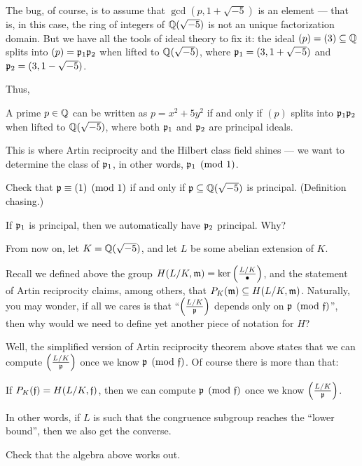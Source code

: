 The bug, of course, is to assume that $\gcd(p, 1 + \sqrt{-5})$ is an element --- that is,
in this case, the ring of integers of $\mathbb Q(\sqrt{-5})$ is not an unique factorization domain.
But we have all the tools of ideal theory to fix it:
the ideal $(p) = (3) \subseteq \mathbb Q$ splits into $(p) = \mathfrak p_1 \mathfrak p_2$ when lifted to $\mathbb Q(\sqrt{-5})$,
where $\mathfrak p_1 = (3, 1 + \sqrt{-5})$ and $\mathfrak p_2 = (3, 1 - \sqrt{-5})$.

Thus,
\begin{proposition}
	A prime $p \in \mathbb Q$ can be written as $p = x^2 + 5 y^2$ if and only if $(p)$ splits into $\mathfrak p_1
	\mathfrak p_2$ when lifted to $\mathbb Q(\sqrt{-5})$, where both $\mathfrak p_1$ and $\mathfrak p_2$ are principal ideals.
\end{proposition}

This is where Artin reciprocity and the Hilbert class field shines --- we want to determine the
class of $\mathfrak p_1$, in other words, $\mathfrak p_1 \pmod{1}$.
\begin{ques}
	Check that $\mathfrak p \equiv (1) \pmod{1}$ if and only if $\mathfrak p \subseteq \mathbb Q(\sqrt{-5})$ is principal.
	(Definition chasing.)
\end{ques}
\begin{ques}
	If $\mathfrak p_1$ is principal, then we automatically have $\mathfrak p_2$ principal. Why?
\end{ques}

From now on, let $K = \mathbb Q(\sqrt{-5})$, and let $L$ be some abelian extension of $K$.

Recall we defined above the group $H(L/K, \mathfrak m) = \ker \left(\frac{L/K}{\bullet}\right)$, and the
statement of Artin reciprocity claims, among others, that $P_K(\mathfrak m) \subseteq H(L/K, \mathfrak m)$.
Naturally, you may wonder, if all we cares is that ``$\left(\frac{L/K}{\mathfrak p}\right)$ depends only on
$\mathfrak p \pmod{\mathfrak f}$'', then why would we need to define yet another piece of notation for $H$?

Well, the simplified version of Artin reciprocity theorem above states that we can compute
$\left(\frac{L/K}{\mathfrak p}\right)$ once we know $\mathfrak p \pmod{\mathfrak f}$.
Of course there is more than that:
\begin{moral}
	If $P_K(\mathfrak f) = H(L/K, \mathfrak f)$, then we can compute $\mathfrak p \pmod{\mathfrak f}$ once we know
	$\left(\frac{L/K}{\mathfrak p}\right)$.
\end{moral}
In other words, if $L$ is such that the congruence subgroup reaches the ``lower bound'',
then we also get the converse.
\begin{ques}
	Check that the algebra above works out.
\end{ques}


